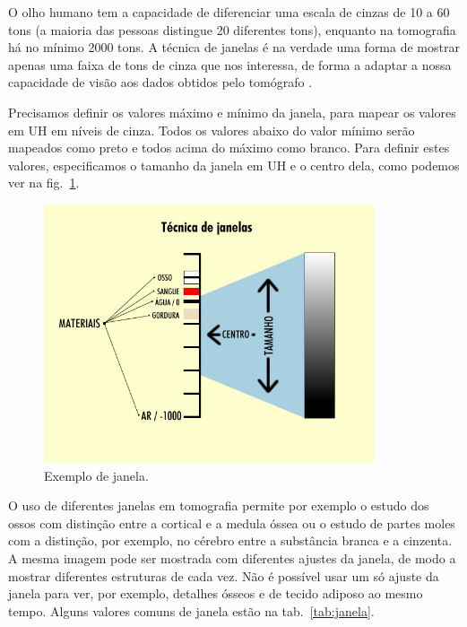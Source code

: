 O olho humano tem a capacidade de diferenciar uma escala de cinzas de 10 a 60 tons (a maioria das pessoas distingue 20 diferentes tons), enquanto na tomografia há no mínimo 2000 tons. A técnica de janelas é na verdade uma forma de mostrar apenas uma faixa de tons de cinza que nos interessa, de forma a adaptar a nossa capacidade de visão aos dados obtidos pelo tomógrafo \cite{tomo}.

Precisamos definir os valores máximo e mínimo da janela, para mapear os valores em UH em níveis de cinza. Todos os valores abaixo do valor mínimo serão mapeados como preto e todos acima do máximo como branco. Para definir estes valores, especificamos o tamanho da janela em UH e o centro dela, como podemos ver na fig.~\ref{fig:tc_janela}.

\begin{figure}[ht]
 \begin{center}
  \includegraphics[height=3.0in]{imagens/tc_janela.jpg}
 \end{center}
 \caption{Exemplo de janela.}
 \label{fig:tc_janela}
\end{figure}

O uso de diferentes janelas em tomografia permite por exemplo o estudo dos ossos com distinção entre a cortical e a medula óssea ou o estudo de partes moles com a distinção, por exemplo, no cérebro entre a substância branca e a cinzenta. A mesma imagem pode ser mostrada com diferentes ajustes da janela, de modo a mostrar diferentes estruturas de cada vez. Não é possível usar um só ajuste da janela para ver, por exemplo, detalhes ósseos e de tecido adiposo ao mesmo tempo. Alguns valores comuns de janela estão na tab.~\ref{tab:janela}.

